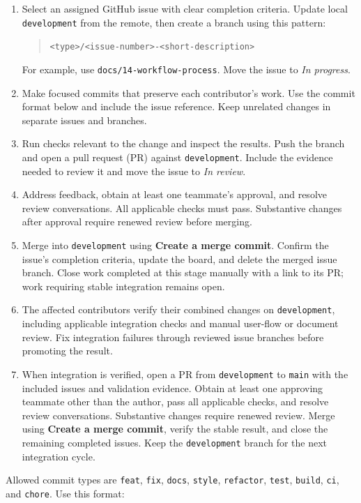 \documentclass{article}
\begin{document}
\begin{enumerate}
  \item Select an assigned GitHub issue with clear completion criteria.
  Update local \texttt{development} from the remote, then create a branch using
  this pattern:
  \begin{quote}
    \texttt{<type>/<issue-number>-<short-description>}
  \end{quote}
  For example, use \texttt{docs/14-workflow-process}. Move the issue to
  \emph{In progress}.
  \item Make focused commits that preserve each contributor's work. Use the
  commit format below and include the issue reference. Keep unrelated changes
  in separate issues and branches.
  \item Run checks relevant to the change and inspect the results. Push the
  branch and open a pull request (PR) against \texttt{development}. Include the
  evidence needed to review it and move the issue to \emph{In review}.
  \item Address feedback, obtain at least one teammate's approval, and
  resolve review conversations. All applicable checks must pass. Substantive
  changes after approval require renewed review before merging.
  \item Merge into \texttt{development} using \textbf{Create a merge commit}.
  Confirm the issue's completion criteria, update the board, and delete the
  merged issue branch. Close work completed at this stage manually with a
  link to its PR; work requiring stable integration remains open.
  \item The affected contributors verify their combined changes on
  \texttt{development}, including applicable integration checks and manual
  user-flow or document review. Fix integration failures through reviewed
  issue branches before promoting the result.
  \item When integration is verified, open a PR from \texttt{development}
  to \texttt{main} with the included issues and validation evidence. Obtain
  at least one approving teammate other than the author, pass all applicable
  checks, and resolve review conversations. Substantive changes require
  renewed review. Merge using \textbf{Create a merge commit}, verify the
  stable result, and close the remaining completed issues. Keep the
  \texttt{development} branch for the next integration cycle.
\end{enumerate}

Allowed commit types are \texttt{feat}, \texttt{fix}, \texttt{docs},
\texttt{style}, \texttt{refactor}, \texttt{test}, \texttt{build},
\texttt{ci}, and \texttt{chore}. Use this format:
\end{document}
